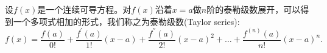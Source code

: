 \begin{subappendices}
\begin{lemma}[泰勒——麦克劳林级数]
  \label{lemma:taylor-maclaurin-series}
  设$f(x)$是一个连续可导方程。对$f(x)$沿着$x=a$做$n$阶的泰勒级数展开，可以得到一个多项式相加的形式，我们称之为泰勒级数(Taylor series):
  \begin{equation}
    \label{eq:taylor-series-def}
    f \left( x \right) = \frac{f(a)}{0!}
    + \frac{f^{'}(a)}{1!} \left( x - a \right)
    + \frac{f^{''}(a)}{2!} \left( x - a \right)^{2}
    + \ldots
    + \frac{f^{(n)}(a)}{n!} \left( x - a \right)^{n}.
  \end{equation}



\begin{figure}[htbp]
  \centering  %
\end{figure}
\end{lemma}
\end{subappendices}
